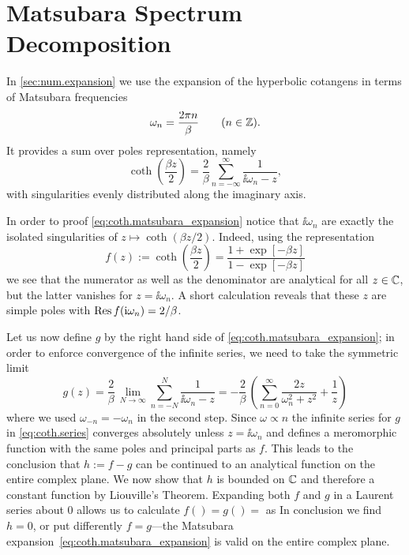 \section{Matsubara Spectrum Decomposition}
\label{sec:coth.matsubara}

In \autoref{sec:num.expansion} we use the expansion of the hyperbolic cotangens in terms of Matsubara frequencies \cite{Ma00_many_particle}
\begin{equation}
  \omega_n = \frac{2\pi n}{\beta} \qquad (n \in \mathbb{Z}).
  \label{eq:coth.matsubara_freq}
\end{equation}
It provides a sum over poles representation, namely
\begin{equation}
  \coth\left(\frac{\beta z}{2}\right) = \frac{2}{\beta} \sum_{n=-\infty}^\infty \frac{1}{\ii\omega_n - z},
  \label{eq:coth.matsubara_expansion}
\end{equation}
with singularities evenly distributed along the imaginary axis.

In order to proof \autoref{eq:coth.matsubara_expansion} notice that $\ii\omega_n$ are exactly the isolated singularities of $z \mapsto \coth(\beta z / 2)$.
Indeed, using the representation
\begin{equation}
  f(z) := \coth\left(\frac{\beta z}{2}\right) = \frac{1 + \exp[-\beta z]}{1 - \exp[-\beta z]}
  \label{eq:coth.representation}
\end{equation}
we see that the numerator as well as the denominator are analytical for all $z \in \mathbb{C}$, but the latter vanishes for $z = \ii \omega_n$.
A short calculation reveals that these $z$ are simple poles with $\operatorname{Res} f(\mathrm{i}\omega_n) = 2/\beta$.

Let us now define $g$ by the right hand side of \autoref{eq:coth.matsubara_expansion}; in order to enforce convergence of the infinite series, we need to take the symmetric limit
\begin{equation}
  g(z) = \frac{2}{\beta} \, \lim_{N\to\infty} \sum_{n=-N}^{N} \frac{1}{\ii\omega_n - z} = - \frac{2}{\beta} \, \left( \sum_{n=0}^\infty \frac{2z}{\omega_n^2 + z^2} + \frac{1}{z} \right)
  \label{eq:coth.series}
\end{equation}
where we used $\omega_{-n} = -\omega_n$ in the second step.
Since $\omega\propto n$ the infinite series for $g$ in \autoref{eq:coth.series} converges absolutely unless $z = \ii\omega_n$ and defines a meromorphic function with the same poles and principal parts as $f$.
This leads to the conclusion that $h := f - g$ can be continued to an analytical function on the entire complex plane.
We now show that $h$ is bounded on $\mathbb{C}$ and therefore a constant function by Liouville's Theorem.
Expanding both $f$ and $g$ in a Laurent series about 0 allows us to calculate $f() = g() = $ as %
In conclusion we find $h = 0$, or put differently $f = g$---the Matsubara expansion~\ref{eq:coth.matsubara_expansion} is valid on the entire complex plane.

